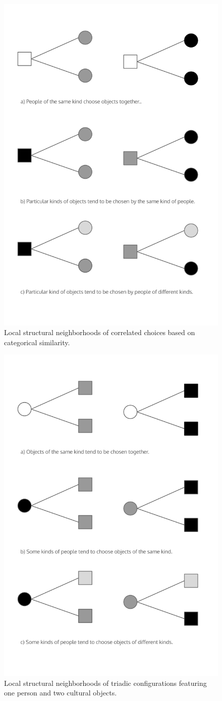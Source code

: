 \documentclass[preprint,12pt,authoryear]{elsarticle}
\begin{document}
\begin{figure}
    \centering
    \includegraphics[width=0.8\linewidth]{Figs/local-struct2.png}
    \caption{Local structural neighborhoods of correlated choices based on categorical similarity.}
    \label{fig:local-struct2}
\end{figure}

\newpage

\begin{figure}
    \centering
    \includegraphics[width=0.8\linewidth]{Figs/local-struct3.png}
    \caption{Local structural neighborhoods of triadic configurations featuring one person and two cultural objects.}
    \label{fig:local-struct3}
\end{figure}
\end{document}
